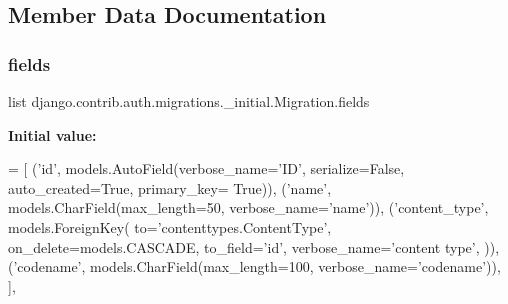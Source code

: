 \subsection{Member Data Documentation}
\mbox{\label{classdjango_1_1contrib_1_1auth_1_1migrations_1_10001__initial_1_1_migration_af9d93c97b56ca45b40dd858619428e7d}} 
\subsubsection{\texorpdfstring{fields}{fields}}
{\footnotesize\ttfamily list django.\+contrib.\+auth.\+migrations.\+\_\+initial.\+Migration.\+fields\hspace{0.3cm}{\ttfamily [static]}}

{\bfseries Initial value\+:}
\begin{DoxyCode}
= [
                (\textcolor{stringliteral}{'id'}, models.AutoField(verbose\_name=\textcolor{stringliteral}{'ID'}, serialize=\textcolor{keyword}{False}, auto\_created=\textcolor{keyword}{True}, primary\_key=\textcolor{keyword}{
      True})),
                (\textcolor{stringliteral}{'name'}, models.CharField(max\_length=50, verbose\_name=\textcolor{stringliteral}{'name'})),
                (\textcolor{stringliteral}{'content\_type'}, models.ForeignKey(
                    to=\textcolor{stringliteral}{'contenttypes.ContentType'},
                    on\_delete=models.CASCADE,
                    to\_field=\textcolor{stringliteral}{'id'},
                    verbose\_name=\textcolor{stringliteral}{'content type'},
                )),
                (\textcolor{stringliteral}{'codename'}, models.CharField(max\_length=100, verbose\_name=\textcolor{stringliteral}{'codename'})),
            ],
\end{DoxyCode}
\mbox{\label{classdjango_1_1contrib_1_1auth_1_1migrations_1_10001__initial_1_1_migration_af30454319113b663f9357046c2058f83}} 
